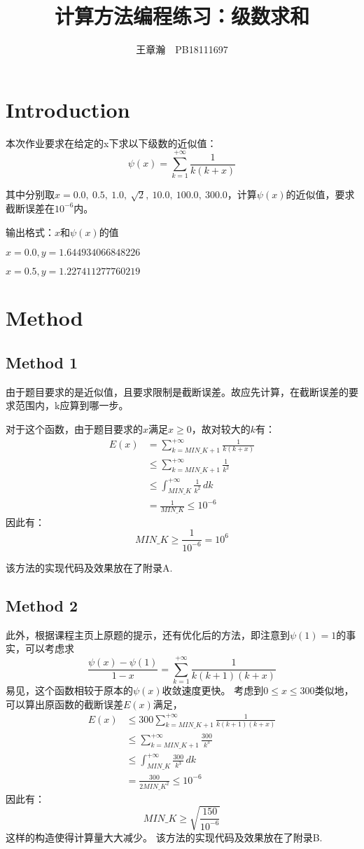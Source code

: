 \documentclass[UTF8]{article}
\title{计算方法编程练习：级数求和}
\author{王章瀚　PB18111697}
\begin{document}
\maketitle


\section{Introduction}
本次作业要求在给定的x下求以下级数的近似值：
$$\psi (x)=\sum_{k=1}^{+\infty}\frac{1}{k(k+x)}$$

其中分别取$x=0.0,\ 0.5,\ 1.0,\ \sqrt{2},\ 10.0,\ 100.0,\ 300.0$，计算$\psi(x)$的近似值，要求截断误差在$10^{-6}$内。

输出格式：$x\mbox{和}\psi (x)\mbox{的值}$

\qquad $x=0.0, y=1.644934066848226$

\qquad $x=0.5, y=1.227411277760219$

\section{Method}
\subsection{Method 1}
由于题目要求的是近似值，且要求限制是截断误差。故应先计算，在截断误差的要求范围内，k应算到哪一步。

对于这个函数，由于题目要求的$x$满足$x\ge 0$，故对较大的$k$有：
\begin{align*}
E(x)&=\sum_{k=MIN\_K+1}^{+\infty}\frac{1}{k(k+x)}\\
&\leq \sum_{k=MIN\_K+1}^{+\infty}\frac{1}{k^{2}}\\
&\leq \int_{MIN\_K}^{+\infty}\frac{1}{k^{2}}\,dk\\
&=\frac{1}{MIN\_K}\leq 10^{-6}
\end{align*}
因此有：$$MIN\_K \ge \frac{1}{10^{-6}} = 10^{6}$$

该方法的实现代码及效果放在了附录A.

\subsection{Method 2}
此外，根据课程主页上原题的提示，还有优化后的方法，即注意到$\psi (1)=1$的事实，可以考虑求$$\frac{\psi(x)-\psi(1)}{1-x}=\sum_{k=1}^{+\infty}\frac{1}{k(k+1)(k+x)}$$
易见，这个函数相较于原本的$\psi(x)$收敛速度更快。
考虑到$0\leq x\leq 300$类似地，可以算出原函数的截断误差$E(x)$满足，
\begin{align*}
E(x)&\leq 300\sum_{k=MIN\_K+1}^{+\infty}\frac{1}{k(k+1)(k+x)}\\
&\leq \sum_{k=MIN\_K+1}^{+\infty}\frac{300}{k^{3}}\\
&\leq \int_{MIN\_K}^{+\infty}\frac{300}{k^{3}}\,dk\\
&=\frac{300}{2MIN\_K^{2}}\leq 10^{-6}
\end{align*}
因此有：$$MIN\_K \ge \sqrt{\frac{150}{10^{-6}}}$$
这样的构造使得计算量大大减少。
该方法的实现代码及效果放在了附录B.
\end{document}
